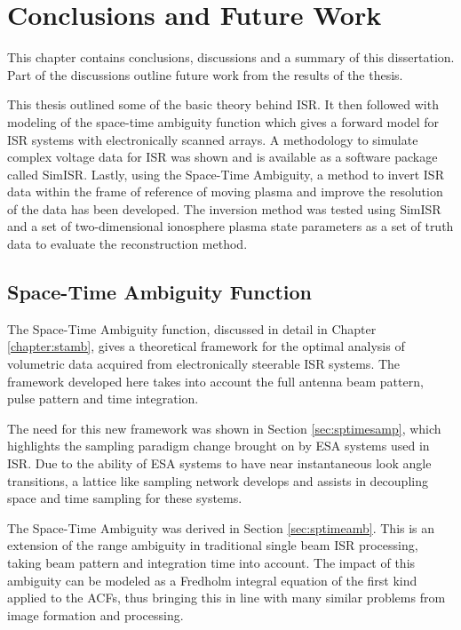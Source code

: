 \chapter{Conclusions and Future Work}
\label{chapter:Conclusions}
\thispagestyle{myheadings}
\graphicspath{{6_Conclusion/Figures/}}

\graphicspath{{6_Conclusion/Figures/}}
This chapter contains conclusions, discussions and a summary of this dissertation. Part of the discussions  outline future work from the results of the thesis.

This thesis outlined some of the basic theory behind ISR. It then followed with modeling of the space-time ambiguity function which gives a forward model for ISR systems with electronically scanned arrays. A methodology to simulate complex voltage data for ISR was shown and is available as a software package called SimISR. Lastly, using the Space-Time Ambiguity, a method to invert ISR data within the frame of reference of moving plasma and improve the resolution of the data has been developed. The inversion method was tested using SimISR and a set of two-dimensional ionosphere plasma state parameters as a set of truth data to evaluate the reconstruction method.

\section{Space-Time Ambiguity Function}
The Space-Time Ambiguity function, discussed in detail in Chapter \ref{chapter:stamb}, gives a theoretical framework for the optimal analysis of volumetric data acquired from electronically steerable ISR systems. The framework developed here takes into account the full antenna beam pattern, pulse pattern and time integration.

The need for this new framework was shown in Section \ref{sec:sptimesamp}, which highlights the sampling paradigm change brought on by ESA systems used in ISR. Due to the ability of ESA systems to have near instantaneous look angle transitions, a lattice like sampling network develops and assists in decoupling space and time sampling for these systems.

The Space-Time Ambiguity was derived in Section \ref{sec:sptimeamb}. This is an extension of the range ambiguity in traditional single beam ISR processing, taking beam pattern and integration time into account. The impact of this ambiguity can be modeled as a Fredholm integral equation of the first kind applied to the ACFs, thus bringing this in line with many similar problems from image formation and processing.

